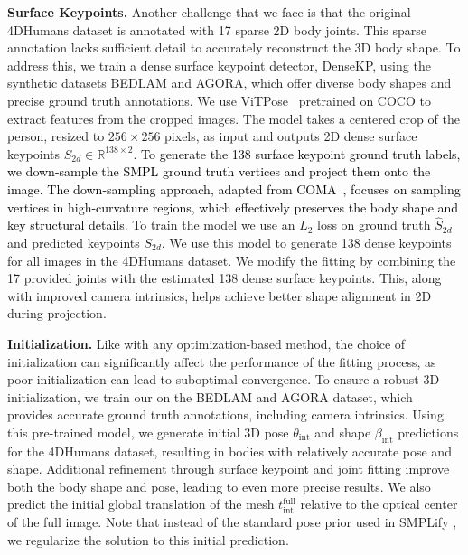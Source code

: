 \noindent\textbf{Surface Keypoints.}
Another challenge that we face is that the original 4DHumans dataset is annotated with 17 sparse 2D body joints. This sparse annotation lacks sufficient detail to accurately reconstruct the 3D body shape.
To address this, we train a dense surface keypoint detector, DenseKP, using the synthetic datasets BEDLAM and AGORA, which offer diverse body shapes and precise ground truth annotations. We use ViTPose~\cite{vitpose} pretrained on COCO to extract features from the cropped images. The model takes a centered crop of the person, resized to $256 \times 256$ pixels, as input and outputs 2D dense surface keypoints $S_{2d} \in \mathbb{R}^{138 \times 2}$. 
\textcolor{black}{To generate the 138 surface keypoint ground truth labels, we down-sample the SMPL ground truth vertices and project them onto the image. The down-sampling approach, adapted from COMA~\cite{coma}, focuses on sampling vertices in high-curvature regions, which effectively preserves the body shape and key structural details.}
To train the model we use an $L_2$ loss on ground truth $\hat{S}_{2d}$ and predicted keypoints $S_{2d}$. 
We use this model to generate 138 dense keypoints for all images in the 4DHumans dataset. 
We modify the fitting by combining the 17 provided joints with the estimated 138 dense surface keypoints. 
This, along with improved camera intrinsics, helps achieve better shape alignment in 2D during projection.  

\noindent\textbf{Initialization.}
Like with any optimization-based method, the choice of initialization can significantly affect the performance of the fitting process, as poor initialization can lead to suboptimal convergence. To ensure a robust 3D initialization, we train our \hpsmodel on the BEDLAM and AGORA dataset, which provides accurate ground truth annotations, including camera intrinsics.
Using this pre-trained model, we generate initial 3D pose $\theta_{\text{int}}$ and shape  $\beta_{\text{int}}$ predictions for the 4DHumans dataset, resulting in bodies with relatively accurate pose and shape. Additional refinement through surface keypoint and joint fitting improve both the body shape and pose, leading to even more precise results. We also predict the initial global translation of the mesh $t^{\text{full}}_{\text{int}}$ relative to the optical center of the full image. 
Note that instead of the standard pose prior used in SMPLify \cite{smplify}, we regularize the solution to this initial prediction.

